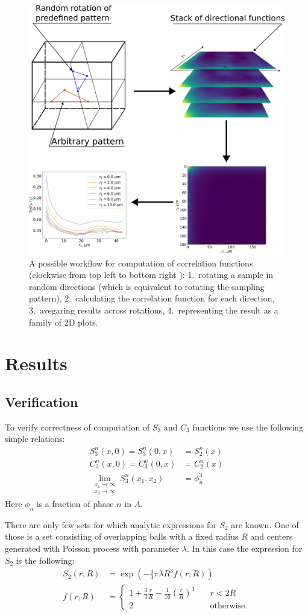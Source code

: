 \documentclass[reprint,amsmath,amssymb,aps,pre,showkeys,showpacs]{revtex4-1}
\begin{document}
\begin{figure}[tp]
  \centering
  \includegraphics[width=0.6\linewidth]{images/workflow.png}
  \caption[]{A possible workflow for computation of correlation functions
    (clockwise from top left to bottom right ): 1.~rotating a sample in random
    directions (which is equivalent to rotating the sampling pattern),
    2.~calculating the correlation function for each direction, 3.~avegaring
    results across rotations, 4.~representing the result as a family of 2D
    plots.}
  \label{fig:workflow}
\end{figure}

\section{Results}
\label{sec:results}
\subsection{Verification}
To verify correctness of computation of $S_3$ and $C_3$ functions we use the
following simple relations:
\begin{align}
  S_3^n (x, 0) = S_3^n (0, x) &= S_2^n(x) \\
  C_3^n (x, 0) = C_3^n (0, x) &= C_2^n(x) \\
  \lim_{\substack{x_1 \to \infty \\ x_2 \to \infty}} S_3^n (x_1, x_2) &= \phi_n^3
\end{align}
Here $\phi_n$ is a fraction of phase $n$ in $A$.

There are only few sets for which analytic expressions for $S_2$ are known. One
of those is a set consisting of overlapping balls with a fixed radius $R$ and
centers generated with Poisson process with parameter $\lambda$. In this case
the expression for $S_2$ is the following:
\begin{equation}
  \begin{aligned}
    S_2(r, R) &= \exp(-\frac{4}{3}\pi\lambda R^3 f(r, R)) \\
    f(r, R) &= \left\{
    \begin{array}{ll}
      1 + \frac{3}{4} \frac{r}{R} - \frac{1}{16} (\frac{r}{R})^3 & \quad r < 2R \\
      2 & \quad \text{otherwise}.
    \end{array}
    \right.
  \end{aligned}
  \label{eq:s2-balls}
\end{equation}
\end{document}
